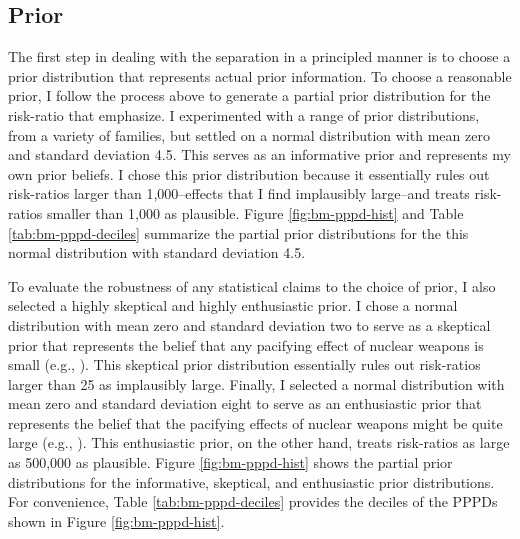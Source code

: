 \documentclass[12pt]{article}
\begin{document}
\subsection*{Prior}

The first step in dealing with the separation in a principled manner is to choose a prior distribution that represents actual prior information. 
To choose a reasonable prior, I follow the process above to generate a partial prior distribution for the risk-ratio that \cite{BellMiller2015} emphasize. 
I experimented with a range of prior distributions, from a variety of families, but settled on a normal distribution with mean zero and standard deviation 4.5. 
This serves as an informative prior and represents my own prior beliefs.   
I chose this prior distribution because it essentially rules out risk-ratios larger than 1,000--effects that I find implausibly large--and treats risk-ratios smaller than 1,000 as plausible. 
Figure \ref{fig:bm-pppd-hist} and Table \ref{tab:bm-pppd-deciles} summarize the partial prior distributions for the this normal distribution with standard deviation 4.5.

To evaluate the robustness of any statistical claims to the choice of prior, I also selected a highly skeptical and highly enthusiastic prior. 
I chose a normal distribution with mean zero and standard deviation two to serve as a skeptical prior that represents the belief that any pacifying effect of nuclear weapons is small (e.g., \citealt{Mueller1988}). 
This skeptical prior distribution essentially rules out risk-ratios larger than 25 as implausibly large. 
Finally, I selected a normal distribution with mean zero and standard deviation eight to serve as an enthusiastic prior that represents the belief that the pacifying effects of nuclear weapons might be quite large (e.g., \citealt{Mearsheimer1993}). 
This enthusiastic prior, on the other hand, treats risk-ratios as large as 500,000 as plausible. 
Figure \ref{fig:bm-pppd-hist} shows the partial prior distributions for the informative, skeptical, and enthusiastic prior distributions. 
For convenience, Table \ref{tab:bm-pppd-deciles} provides the deciles of the PPPDs shown in Figure \ref{fig:bm-pppd-hist}. 
\end{document}
